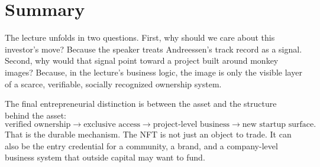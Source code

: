 \section{Summary}

The lecture unfolds in two questions. First, why should we care about this investor's move? Because the speaker treats Andreessen's track record as a signal. Second, why would that signal point toward a project built around monkey images? Because, in the lecture's business logic, the image is only the visible layer of a scarce, verifiable, socially recognized ownership system.

The final entrepreneurial distinction is between the asset and the structure behind the asset:
\begin{equation}
\text{verified ownership}
\longrightarrow
\text{exclusive access}
\longrightarrow
\text{project-level business}
\longrightarrow
\text{new startup surface}.
\end{equation}
That is the durable mechanism. The NFT is not just an object to trade. It can also be the entry credential for a community, a brand, and a company-level business system that outside capital may want to fund.
